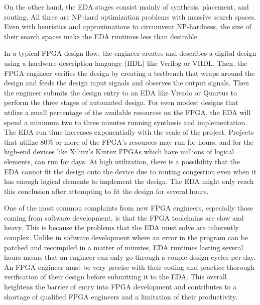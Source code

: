 \documentclass{article}
\begin{document}
    On the other hand, the EDA stages consist mainly of synthesis, placement, and routing.
    All three are NP-hard optimization problems with massive search spaces.
    Even with heuristics and approximations to circumvent NP-hardness, the size of their search spaces make the EDA runtimes less than desirable.
    
    In a typical FPGA design flow, the engineer creates and describes a digital design using a hardware description language (HDL) like Verilog or VHDL.     
    Then, the FPGA engineer verifies the design by creating a testbench that wraps around the design and feeds the design input signals and observes the output signals.
    Then the engineer submits the design entry to an EDA like Vivado or Quartus to perform the three stages of automated design. 
    For even modest designs that utilize a small percentage of the available resources on the FPGA, the EDA will spend a minimum two to three minutes running synthesis and implementation.
    The EDA run time increases exponentially with the scale of the project. 
    Projects that utilize 80\% or more of the FPGA's resources may run for hours, and for the high-end devices like Xilinx's Kintex FPGAs which have millions of logical elements, can run for days.
    At high utilization, there is a possibility that the EDA cannot fit the design onto the device due to routing congestion even when it has enough logical elements to implement the design. 
    The EDA might only reach this conclusion after attempting to fit the design for several hours. 

    One of the most common complaints from new FPGA engineers, especially those coming from software development, is that the FPGA toolchains are slow and heavy.
    This is because the problems that the EDA must solve are inherently complex.
    Unlike in software development where an error in the program can be patched and recompiled in a matter of minutes, EDA runtimes lasting several hours means that an engineer can only go through a couple design cycles per day. 
    An FPGA engineer must be very precise with their coding and practice thorough verification of their design before submitting it to the EDA.
    This overall heightens the barrier of entry into FPGA development and contributes to a shortage of qualified FPGA engineers and a limitation of their productivity. 
\end{document}
